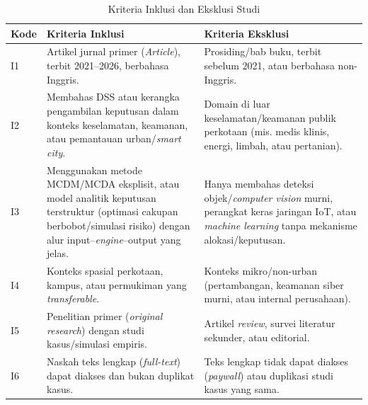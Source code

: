 \documentclass[10pt,twocolumn,a4paper]{article}
\begin{document}
\begin{table}[!t]
\centering
\caption{Kriteria Inklusi dan Eksklusi Studi}\label{tab:criteria}
\footnotesize
\begin{tabularx}{\textwidth}{@{}l>{\raggedright\arraybackslash}X>{\raggedright\arraybackslash}X@{}}
\toprule
Kode & Kriteria Inklusi & Kriteria Eksklusi \\
\midrule
I1 & Artikel jurnal primer (\textit{Article}), terbit 2021--2026, berbahasa Inggris. & Prosiding/bab buku, terbit sebelum 2021, atau berbahasa non-Inggris. \\
I2 & Membahas DSS atau kerangka pengambilan keputusan dalam konteks keselamatan, keamanan, atau pemantauan urban/\textit{smart city}. & Domain di luar keselamatan/keamanan publik perkotaan (mis. medis klinis, energi, limbah, atau pertanian). \\
I3 & Menggunakan metode MCDM/MCDA eksplisit, atau model analitik keputusan terstruktur (optimasi cakupan berbobot/simulasi risiko) dengan alur input--\textit{engine}--output yang jelas. & Hanya membahas deteksi objek/\textit{computer vision} murni, perangkat keras jaringan IoT, atau \textit{machine learning} tanpa mekanisme alokasi/keputusan. \\
I4 & Konteks spasial perkotaan, kampus, atau permukiman yang \textit{transferable}. & Konteks mikro/non-urban (pertambangan, keamanan siber murni, atau internal perusahaan). \\
I5 & Penelitian primer (\textit{original research}) dengan studi kasus/simulasi empiris. & Artikel \textit{review}, survei literatur sekunder, atau editorial. \\
I6 & Naskah teks lengkap (\textit{full-text}) dapat diakses dan bukan duplikat kasus. & Teks lengkap tidak dapat diakses (\textit{paywall}) atau duplikasi studi kasus yang sama. \\
\bottomrule
\end{tabularx}
\end{table}
\end{document}

